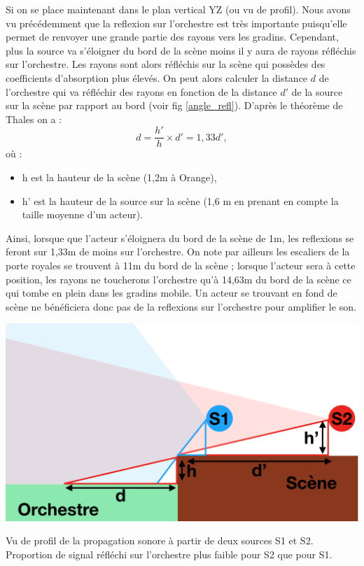 Si on se place maintenant dans le plan vertical YZ (ou vu de profil). Nous avons vu précédemment que la reflexion sur l'orchestre est très importante puisqu'elle permet de renvoyer une grande partie des rayons vers les gradins. Cependant, plus la source va s'éloigner du bord de la scène moins il y aura de rayons réfléchis sur l'orchestre. Les rayons sont alors réfléchis sur la scène qui possèdes des coefficients d'absorption plus élevés. On peut alors calculer la distance $d$ de l'orchestre qui va réfléchir des rayons en fonction de la distance $d'$ de la source sur la scène par rapport au bord (voir fig \ref{angle_refl}). D'après le théorème de Thales on a :
\begin{equation}
d = \frac{h'}{h}\times d' = 1,33d',
\end{equation}
où :
\begin{itemize}
\item h est la hauteur de la scène (1,2m à Orange),
\item h' est la hauteur de la source sur la scène (1,6 m en prenant en compte la taille moyenne d'un acteur).
\end{itemize}
Ainsi, lorsque que l'acteur s'éloignera du bord de la scène de 1m, les reflexions se feront sur 1,33m de moins sur l'orchestre. On note par ailleurs les escaliers de la porte royales se trouvent à 11m du bord de la scène ; lorsque l'acteur sera à cette position, les rayons ne toucherons l'orchestre qu'à 14,63m du bord de la scène ce qui tombe en plein dans les gradins mobile. Un acteur se trouvant en fond de scène ne bénéficiera donc pas de la reflexions sur l'orchestre pour amplifier le son.
\begin{figureth}
	\includegraphics[width=0.8\linewidth]{images/angle_refl}
	\caption{Vu de profil de la propagation sonore à partir de deux sources S1 et S2. Proportion de signal réfléchi sur l'orchestre plus faible pour S2 que pour S1.}
	\label{angle_refl}
\end{figureth}

